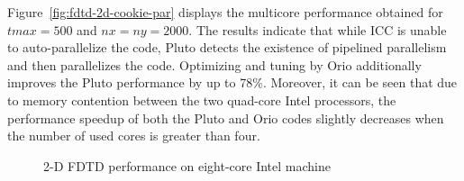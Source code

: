 Figure~\ref{fig:fdtd-2d-cookie-par} displays the multicore performance
obtained for $tmax=500$ and $nx=ny=2000$. The results indicate that
while ICC is unable to auto-parallelize the code, Pluto detects the
existence of pipelined parallelism and then parallelizes the
code. Optimizing and tuning by Orio additionally improves the Pluto
performance by up to 78\%. Moreover, it can be seen that due to memory
contention between the two quad-core Intel processors, the performance
speedup of both the Pluto and Orio codes slightly decreases when the
number of used cores is greater than four.
 
\begin{figure}[htb] 
\begin{center} 
    
\end{center}
\vspace{-.2in} 
\caption{2-D FDTD performance on eight-core Intel machine} 
\label{fig:fdtd-2d-cookie-results} 
\vspace{-.2in}
\end{figure} 

 
